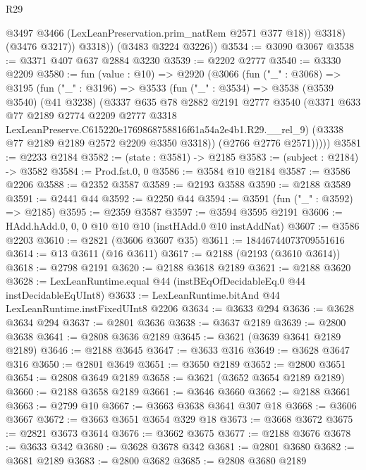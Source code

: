 \begin{lexlean}{R29}
\begin{coremodule}
                @3497
                @3466
                (LexLeanPreservation.prim_natRem @2571 @377 @18))
              @3318)
            (@3476 @3217))
          @3318))
      (@3483 @3224 @3226))
@3534 := @3090 @3067
@3538 := @3371 @407 @637 @2884 @3230
@3539 := @2202 @2777
@3540 := @3330 @2209
@3580 := fun (value : @10) =>
  @2920
    (@3066
      (fun ("_" : @3068) =>
      @3195
        (fun ("_" : @3196) =>
        @3533
          (fun ("_" : @3534) =>
          @3538
            (@3539 @3540)
            (@41 @3238)
            (@3337
              @635
              @78
              @2882
              @2191
              @2777
              @3540
              (@3371
                @633
                @77
                @2189
                @2774
                @2209
                @2777
                @3318
                LexLeanPreserve.C615220e1769868758816f61a54a2e4b1.R29.__rel_9)
              (@3338 @77 @2189 @2189 @2572 @2209 @3350 @3318))
            (@2766 @2776 @2571)))))
@3581 := @2233 @2184
@3582 := (state : @3581) -> @2185
@3583 := (subject : @2184) -> @3582
@3584 := Prod.fst.{0, 0}
@3586 := @3584 @10 @2184
@3587 := @3586 @2206
@3588 := @2352 @3587
@3589 := @2193 @3588
@3590 := @2188 @3589
@3591 := @2441 @44
@3592 := @2250 @44
@3594 := @3591 (fun ("_" : @3592) => @2185)
@3595 := @2359 @3587
@3597 := @3594 @3595 @2191
@3606 := HAdd.hAdd.{0, 0, 0} @10 @10 @10 (instHAdd.{0} @10 instAddNat)
@3607 := @3586 @2203
@3610 := @2821 (@3606 @3607 @35)
@3611 := 18446744073709551616
@3614 := @13 @3611 (@16 @3611)
@3617 := @2188 (@2193 (@3610 @3614))
@3618 := @2798 @2191
@3620 := @2188 @3618 @2189
@3621 := @2188 @3620
@3628 := LexLeanRuntime.equal @44 (instBEqOfDecidableEq.{0} @44 instDecidableEqUInt8)
@3633 := LexLeanRuntime.bitAnd @44 LexLeanRuntime.instFixedUInt8 @2206
@3634 := @3633 @294
@3636 := @3628 @3634 @294
@3637 := @2801 @3636
@3638 := @3637 @2189
@3639 := @2800 @3638
@3641 := @2808 @3636 @2189
@3645 := @3621 (@3639 @3641 @2189 @2189)
@3646 := @2188 @3645
@3647 := @3633 @316
@3649 := @3628 @3647 @316
@3650 := @2801 @3649
@3651 := @3650 @2189
@3652 := @2800 @3651
@3654 := @2808 @3649 @2189
@3658 := @3621 (@3652 @3654 @2189 @2189)
@3660 := @2188 @3658 @2189
@3661 := @3646 @3660
@3662 := @2188 @3661
@3663 := @2799 @10
@3667 := @3663 @3638 @3641 @307 @18
@3668 := @3606 @3667
@3672 := @3663 @3651 @3654 @329 @18
@3673 := @3668 @3672
@3675 := @2821 @3673 @3614
@3676 := @3662 @3675
@3677 := @2188 @3676
@3678 := @3633 @342
@3680 := @3628 @3678 @342
@3681 := @2801 @3680
@3682 := @3681 @2189
@3683 := @2800 @3682
@3685 := @2808 @3680 @2189

\end{coremodule}
\end{lexlean}
